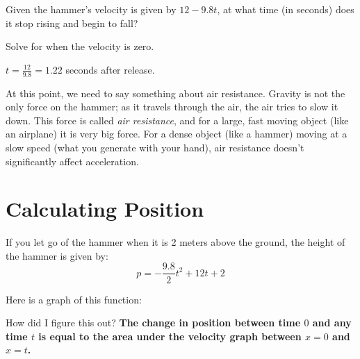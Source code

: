 \begin{Exercise}[title={When is the apex of flight?}, label=vapex]
  Given the hammer's velocity is given by $12 - 9.8t$, at what time (in seconds)
  does it stop rising and begin to fall?
\end{Exercise}
\begin{Answer}[ref=vapex]
  Solve for when the velocity is zero.

  $t = \frac{12}{9.8} = 1.22$ seconds after release.
\end{Answer}

At this point, we need to say something about air resistance. Gravity
is not the only force on the hammer; as it travels through the air,
the air tries to slow it down. This force is called \emph{air resistance},
and for a large, fast moving object (like an airplane) it is very big force. For a
dense object (like a hammer) moving at a slow speed (what you generate
with your hand), air resistance doesn't significantly affect acceleration.

\section{Calculating Position}

If you let go of the hammer when it is 2 meters
above the ground, the height of the hammer is given by:
\begin{equation*}
  p = -\frac{9.8}{2}t^2 + 12t + 2
\end{equation*}

Here is a graph of this function:



How did I figure this out? \textbf{The change in position between time
  $0$ and any time $t$ is equal to the area under the velocity graph
  between $x = 0$ and $x = t$.}

